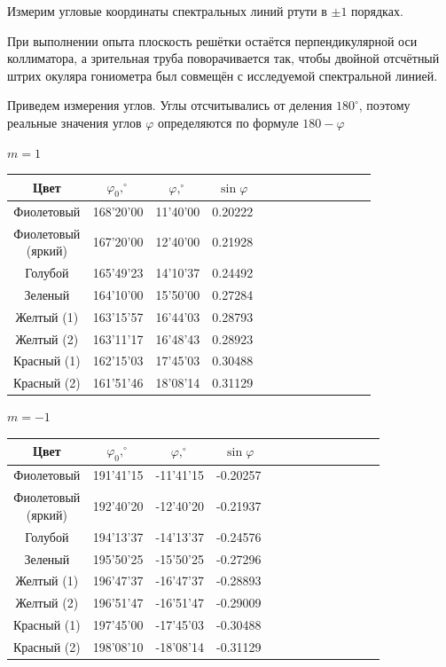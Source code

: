 \documentclass[14pt]{article}
\begin{document}
Измерим угловые координаты спектральных линий ртути в $\pm 1$ порядках. 

При выполнении опыта плоскость решётки остаётся перпендикулярной оси коллиматора, а зрительная труба поворачивается так, чтобы двойной отсчётный штрих окуляра гониометра был совмещён с исследуемой спектральной линией.

Приведем измерения углов. Углы отсчитывались от деления $180^{\circ}$, поэтому реальные значения углов $\varphi$ определяются по формуле $180-\varphi$

\vspace{1cm}
$m = 1$
\begin{center}
\begin{tabular}{|c|c|c|c|c|c|c|c|c|c|c|c|c|}
\hline
Цвет		&	$\varphi_0, ^\circ$		&	$\varphi, ^\circ$ 			&	$\sin\varphi$	\\
\hline
Фиолетовый	&	168'20'00				&	11'40'00					&	0.20222			\\
\hline
\shortstack{Фиолетовый\\(яркий)}		&	167'20'00	&	12'40'00	&	0.21928			\\
\hline
Голубой		&	165'49'23				&	14'10'37					&	0.24492			\\
\hline
Зеленый		&	164'10'00				&	15'50'00					&	0.27284			\\
\hline
Желтый (1)	&	163'15'57				&	16'44'03					&	0.28793			\\
\hline
Желтый (2)	&	163'11'17				&	16'48'43					&	0.28923			\\
\hline
Красный (1)	&	162'15'03				&	17'45'03					&	0.30488			\\
\hline
Красный (2)	&	161'51'46				&	18'08'14					&	0.31129			\\
\hline
\end{tabular}
\end{center}

$m = -1$
\begin{center}
\begin{tabular}{|c|c|c|c|c|c|c|c|c|c|c|c|c|}
\hline
Цвет		&	$\varphi_0, ^\circ$		&	$\varphi, ^\circ$ 			&	$\sin\varphi$	\\
\hline
Фиолетовый	&	191'41'15				&	-11'41'15					&	-0.20257		\\
\hline
\shortstack{Фиолетовый\\(яркий)}		&	192'40'20	&	-12'40'20	&	-0.21937		\\
\hline
Голубой		&	194'13'37				&	-14'13'37					&	-0.24576		\\
\hline
Зеленый		&	195'50'25				&	-15'50'25					&	-0.27296		\\
\hline
Желтый (1)	&	196'47'37				&	-16'47'37					&	-0.28893		\\
\hline
Желтый (2)	&	196'51'47				&	-16'51'47					&	-0.29009		\\
\hline
Красный (1)	&	197'45'00				&	-17'45'03					&	-0.30488		\\
\hline
Красный (2)	&	198'08'10				&	-18'08'14					&	-0.31129		\\
\hline
\end{tabular}
\end{center}
\end{document}
